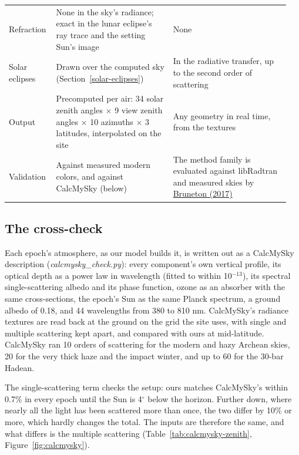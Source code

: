 \documentclass[9pt,twocolumn]{extarticle}
\begin{document}
{\begin{longtable}{@{}p{0.15\linewidth}p{0.4\linewidth}p{0.4\linewidth}@{}}
Refraction & None in the sky's radiance; exact in the lunar eclipse's ray trace and the setting Sun's image & None \\
Solar eclipses & Drawn over the computed sky (Section~\ref{solar-eclipses}) & In the radiative transfer, up to the second order of scattering \\
Output & Precomputed per air: 34 solar zenith angles $\times$ 9 view zenith angles $\times$ 10 azimuths $\times$ 3 latitudes, interpolated on the site & Any geometry in real time, from the textures \\
Validation & Against measured modern colors, and against CalcMySky (below) & The method family is evaluated against libRadtran and measured skies by \protect\hyperlink{cite.bruneton2017}{Bruneton (2017)} \\
\bottomrule
\end{longtable}}

\subsection*{The cross-check}

Each epoch's atmosphere, as our model builds it, is written out as a CalcMySky description (\emph{calcmysky\_check.py}): every component's own vertical profile, its optical depth as a power law in wavelength (fitted to within 10$^{-13}$), its spectral single-scattering albedo and its phase function, ozone as an absorber with the same cross-sections, the epoch's Sun as the same Planck spectrum, a ground albedo of 0.18, and 44 wavelengths from 380 to 810 nm. CalcMySky's radiance textures are read back at the ground on the grid the site uses, with single and multiple scattering kept apart, and compared with ours at mid-latitude. CalcMySky ran 10 orders of scattering for the modern and hazy Archean skies, 20 for the very thick haze and the impact winter, and up to 60 for the 30-bar Hadean.

The single-scattering term checks the setup: ours matches CalcMySky's within 0.7\% in every epoch until the Sun is 4$^\circ$ below the horizon. Further down, where nearly all the light has been scattered more than once, the two differ by 10\% or more, which hardly changes the total. The inputs are therefore the same, and what differs is the multiple scattering (Table~\ref{tab:calcmysky-zenith}, Figure~\ref{fig:calcmysky}).
\end{document}
